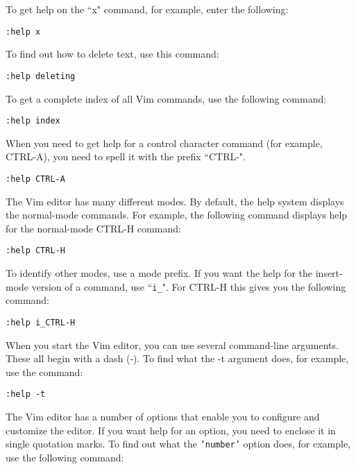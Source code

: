 To get help on the ``x" command, for example, enter the following:

 \begin{Verbatim}[samepage=true]
 :help x
 \end{Verbatim}

To find out how to delete text, use this command:

 \begin{Verbatim}[samepage=true]
 :help deleting
 \end{Verbatim}

To get a complete index of all Vim commands, use the following command:

 \begin{Verbatim}[samepage=true]
 :help index
 \end{Verbatim}

When you need to get help for a control character command (for example, CTRL-A), you need to spell it with the prefix ``CTRL-".

 \begin{Verbatim}[samepage=true]
 :help CTRL-A
 \end{Verbatim}

The Vim editor has many different modes.
By default, the help system displays the normal-mode commands.
For example, the following command displays help for the normal-mode CTRL-H command:

 \begin{Verbatim}[samepage=true]
 :help CTRL-H
 \end{Verbatim}

To identify other modes, use a mode prefix.
If you want the help for the insert-mode version of a command, use ``\texttt{i\_}".
For CTRL-H this gives you the following command:

 \begin{Verbatim}[samepage=true]
 :help i_CTRL-H
 \end{Verbatim}

When you start the Vim editor, you can use several command-line arguments.
These all begin with a dash (-).
To find what the -t argument does, for example, use the command:

 \begin{Verbatim}[samepage=true]
 :help -t
 \end{Verbatim}

The Vim editor has a number of options that enable you to configure and customize the editor.
If you want help for an option, you need to enclose it in single quotation marks.
To find out what the \texttt{'number'} option does, for example, use the following command:

